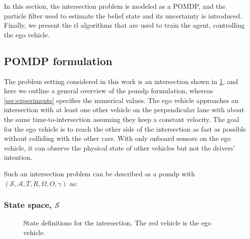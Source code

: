 In this section, the intersection problem is modeled as a POMDP, and the particle filter used to estimate the belief state and its uncertainty is introduced. Finally, we present the \gls{rl} algorithms that are used to train the agent, controlling the ego vehicle.

\subsection{POMDP formulation}
\label{sec:pomdp_formulation}

The problem setting considered in this work is an intersection shown in \ref{fig:states}, and here we outline a general overview of the \gls{pomdp} formulation, whereas \ref{sec:experiments} specifies the numerical values. 
The ego vehicle approaches an intersection with at least one other vehicle on the perpendicular lane with about the same time-to-intersection assuming they keep a constant velocity. The goal for the ego vehicle is to reach the other side of the intersection as fast as possible without colliding with the other cars. With only onboard sensors on the ego vehicle, it can observe the physical state of other vehicles but not the drivers' intention. 

Such an intersection problem can be described as a \gls{pomdp} with $(\mathcal{S},\mathcal{A},T,R,\Omega,O,\gamma)$ as:

\subsubsection{State space, $\mathcal{S}$}
\begin{figure}[!t]
    \centering
        
        \caption{State definitions for the intersection. The red vehicle is the ego vehicle.}
    \label{fig:states}
\end{figure}
%         
%         

